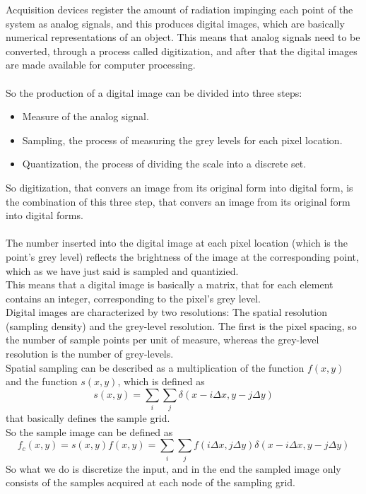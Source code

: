 Acquisition devices register the amount of radiation impinging each point of the system as analog signals, and this produces digital images, which are basically numerical representations of an object. This means that analog signals need to be converted, through a process called digitization, and after that the digital images are made available for computer processing. \\ \\
So the production of a digital image can be divided into three steps:
\begin{itemize}
	\item Measure of the analog signal.
	\item Sampling, the process of measuring the grey levels for each pixel location. 
	\item Quantization, the process of dividing the scale into a discrete set. 
\end{itemize}
So digitization, that convers an image from its original form into digital form, is the combination of this three step, that convers an image from its original form into digital forms. \\ \\
The number inserted into the digital image at each pixel location (which is the point's grey level) reflects the brightness of the image at the corresponding point, which as we have just said is sampled and quantizied. \\
This means that a digital image is basically a matrix, that for each element contains an integer, corresponding to the pixel's grey level. \\
Digital images are characterized by two resolutions: The spatial resolution (sampling density) and the grey-level resolution. The first is the pixel spacing, so the number of sample points per unit of measure, whereas the grey-level resolution is the number of grey-levels. \\
Spatial sampling can be described as a multiplication of the function $f(x,y)$ and the function $s(x,y)$, which is defined as
$$
	s(x,y) = \sum_i\sum_j\delta(x-i\Delta x,y-j\Delta y)
$$
that basically defines the sample grid. \\
So the sample image can be defined as 
$$
	f_c(x,y) = s(x,y)f(x,y) = \sum_i\sum_j f(i\Delta x,j\Delta y)\delta(x-i\Delta x,y-j\Delta y)
$$
So what we do is discretize the input, and in the end the sampled image only consists of the samples acquired at each node of the sampling grid. \\ \\
